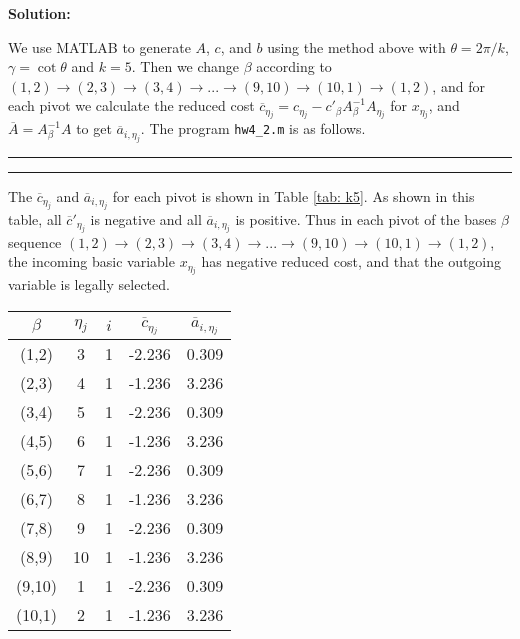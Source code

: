\textbf{Solution:}

We use MATLAB to generate $A$, $c$, and $b$ using the method above with $\theta=2\pi/k$, $\gamma=\cot \theta$ and $k=5$. Then we change $\beta$ according to $(1,2) \rightarrow (2, 3) \rightarrow (3, 4) \rightarrow ... \rightarrow (9, 10) \rightarrow (10, 1) \rightarrow (1, 2)$, and for each pivot we calculate the reduced cost $\overline{c}_{\eta{}_j}=c_{\eta{}_j}-c'_\beta{}A_{\beta}^{-1}A_{\eta{}_j}$ for $x_{\eta{}_j}$, and $\overline{A}=A_{\beta}^{-1}A$ to get $\overline{a}_{i,\eta{}_j}$. The program \verb!hw4_2.m! is as follows.

\bigskip
\hrule 
\small

\normalsize
\hrule
\bigskip


The $\overline{c}_{\eta{}_j}$ and $\overline{a}_{i,\eta{}_j}$ for each pivot is shown in Table \ref{tab: k5}. As shown in this table, all $\overline{c}'_{\eta{}_j}$ is negative and all $\overline{a}_{i,\eta{}_j}$ is positive. Thus in each pivot of the bases $\beta$ sequence $(1,2) \rightarrow (2, 3) \rightarrow (3, 4) \rightarrow ... \rightarrow (9, 10) \rightarrow (10, 1) \rightarrow (1, 2)$, the incoming basic variable $x_{\eta{}_j}$ has negative reduced cost, and that the outgoing variable is legally selected.

\begin{table*}[!h]
\centering
\small
\begin{tabular}{|c|c|c|c|c|}\hline
$\beta$ & $\eta{}_j$ & $i$ & $\overline{c}_{\eta{}_j}$ & $\overline{a}_{i,\eta{}_j}$ \\
\hline
(1,2) & 	3  & 	1  & 	-2.236  & 	0.309\\\hline
(2,3)  & 	4 & 	1 & 	-1.236 & 	3.236\\\hline
(3,4) & 	5 & 	1 & 	-2.236 & 	0.309\\\hline
(4,5) & 	6 & 	1 & 	-1.236 & 	3.236\\\hline
(5,6) & 	7 & 	1 & 	-2.236 & 	0.309\\\hline
(6,7) & 	8 & 	1 & 	-1.236 & 	3.236\\\hline
(7,8) & 	9 & 	1 & 	-2.236 & 	0.309\\\hline
(8,9) & 	10	 & 1 & 	-1.236 & 	3.236\\\hline
(9,10)	 & 1 & 	1 & 	-2.236 & 	0.309\\\hline
(10,1) & 	2 & 	1 & 	-1.236 & 	3.236\\\hline
\end{tabular}
\caption{Reduced cost and $\overline{a}_{i,\eta{}_j}$ checking for pivots with $k=5$.}
\label{tab: k5}
\end{table*}

